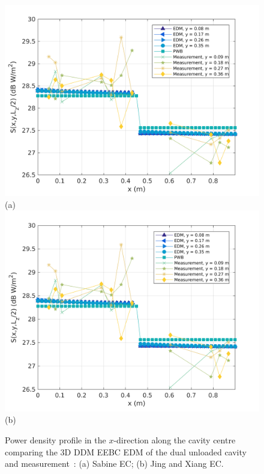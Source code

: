 \documentclass[a4paper]{article}
\numberwithin{equation}{section}
\begin{document}
\begin{figure}[ht]
\begin{center}
\includegraphics[width=0.6\linewidth]{figures/DDM-EEBC_3D_DU_PowerDensityProfileXMeas}\\
{\footnotesize (a)}\\
\vspace{2mm}
\includegraphics[width=0.6\linewidth]{figures/DDM-EEBC_3D_DU_PowerDensityProfileXMeas_JX}\\
{\footnotesize (b)}\\
\vspace{-2mm}
\caption{\label{fg:measprofsdu} Power density profile in the $x$-direction along the cavity centre comparing
the 3D DDM EEBC EDM of the dual unloaded cavity and measurement~\citep{Flintoft2017b}: (a) Sabine EC; (b) Jing and Xiang EC.}
\end{center}
\end{figure}
\end{document}
